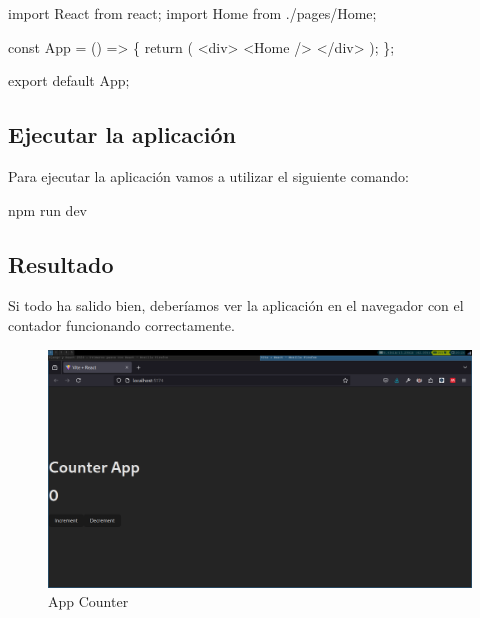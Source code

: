 \documentclass[
  a4paper,
  DIV=11,
  numbers=noendperiod,
  onepage,
  openany]{scrreprt}
\newenvironment{Shaded}{\begin{snugshade}}{\end{snugshade}}
\newcommand{\ControlFlowTok}[1]{\textcolor[rgb]{0.00,0.23,0.31}{#1}}
\newcommand{\ExtensionTok}[1]{\textcolor[rgb]{0.00,0.23,0.31}{#1}}
\newcommand{\FunctionTok}[1]{\textcolor[rgb]{0.28,0.35,0.67}{#1}}
\newcommand{\ImportTok}[1]{\textcolor[rgb]{0.00,0.46,0.62}{#1}}
\newcommand{\KeywordTok}[1]{\textcolor[rgb]{0.00,0.23,0.31}{#1}}
\newcommand{\NormalTok}[1]{\textcolor[rgb]{0.00,0.23,0.31}{#1}}
\newcommand{\OperatorTok}[1]{\textcolor[rgb]{0.37,0.37,0.37}{#1}}
\newcommand{\StringTok}[1]{\textcolor[rgb]{0.13,0.47,0.30}{#1}}
\begin{document}
\begin{Shaded}
\begin{Highlighting}[]
\ImportTok{import}\NormalTok{ React }\ImportTok{from} \StringTok{\textquotesingle{}react\textquotesingle{}}\OperatorTok{;}
\ImportTok{import}\NormalTok{ Home }\ImportTok{from} \StringTok{\textquotesingle{}./pages/Home\textquotesingle{}}\OperatorTok{;}

\KeywordTok{const}\NormalTok{ App }\OperatorTok{=}\NormalTok{ () }\KeywordTok{=\textgreater{}}\NormalTok{ \{}
  \ControlFlowTok{return}\NormalTok{ (}
    \KeywordTok{\textless{}div\textgreater{}}
      \FunctionTok{\textless{}Home} \FunctionTok{/\textgreater{}}
    \KeywordTok{\textless{}/div\textgreater{}}
\NormalTok{  )}\OperatorTok{;}
\NormalTok{\}}\OperatorTok{;}

\ImportTok{export} \ImportTok{default}\NormalTok{ App}\OperatorTok{;}
\end{Highlighting}
\end{Shaded}

\subsection{Ejecutar la aplicación}\label{ejecutar-la-aplicaciuxf3n}

Para ejecutar la aplicación vamos a utilizar el siguiente comando:

\begin{Shaded}
\begin{Highlighting}[]
\ExtensionTok{npm}\NormalTok{ run dev}
\end{Highlighting}
\end{Shaded}

\subsection{Resultado}\label{resultado}

Si todo ha salido bien, deberíamos ver la aplicación en el navegador con
el contador funcionando correctamente.

\begin{figure}[H]

{\centering \includegraphics{images/counter.png}

}

\caption{App Counter}

\end{figure}%
\end{document}

